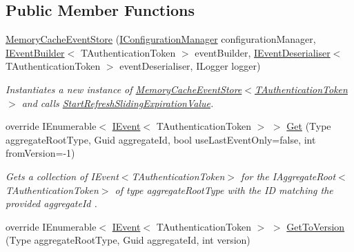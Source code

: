 \subsection*{Public Member Functions}
\begin{DoxyCompactItemize}
\item 
\hyperlink{classCqrs_1_1Events_1_1MemoryCacheEventStore_a4de9139e05d35cb62ba295569a1dc94f_a4de9139e05d35cb62ba295569a1dc94f}{Memory\+Cache\+Event\+Store} (\hyperlink{interfaceCqrs_1_1Configuration_1_1IConfigurationManager}{I\+Configuration\+Manager} configuration\+Manager, \hyperlink{interfaceCqrs_1_1Events_1_1IEventBuilder}{I\+Event\+Builder}$<$ T\+Authentication\+Token $>$ event\+Builder, \hyperlink{interfaceCqrs_1_1Events_1_1IEventDeserialiser}{I\+Event\+Deserialiser}$<$ T\+Authentication\+Token $>$ event\+Deserialiser, I\+Logger logger)
\begin{DoxyCompactList}\small\item\em Instantiates a new instance of \hyperlink{classCqrs_1_1Events_1_1MemoryCacheEventStore_a4de9139e05d35cb62ba295569a1dc94f_a4de9139e05d35cb62ba295569a1dc94f}{Memory\+Cache\+Event\+Store$<$\+T\+Authentication\+Token$>$} and calls \hyperlink{classCqrs_1_1Events_1_1MemoryCacheEventStore_ac2a6da8b2faac7bd5f333bff592fc8f2_ac2a6da8b2faac7bd5f333bff592fc8f2}{Start\+Refresh\+Sliding\+Expiration\+Value}. \end{DoxyCompactList}\item 
override I\+Enumerable$<$ \hyperlink{interfaceCqrs_1_1Events_1_1IEvent}{I\+Event}$<$ T\+Authentication\+Token $>$ $>$ \hyperlink{classCqrs_1_1Events_1_1MemoryCacheEventStore_a1391c260f52f5cf18058cf88ad2d16de_a1391c260f52f5cf18058cf88ad2d16de}{Get} (Type aggregate\+Root\+Type, Guid aggregate\+Id, bool use\+Last\+Event\+Only=false, int from\+Version=-\/1)
\begin{DoxyCompactList}\small\item\em Gets a collection of I\+Event$<$\+T\+Authentication\+Token$>$ for the I\+Aggregate\+Root$<$\+T\+Authentication\+Token$>$ of type {\itshape aggregate\+Root\+Type}  with the ID matching the provided {\itshape aggregate\+Id} . \end{DoxyCompactList}\item 
override I\+Enumerable$<$ \hyperlink{interfaceCqrs_1_1Events_1_1IEvent}{I\+Event}$<$ T\+Authentication\+Token $>$ $>$ \hyperlink{classCqrs_1_1Events_1_1MemoryCacheEventStore_a818fe6785622ebb7b0c6033a0b8ffc89_a818fe6785622ebb7b0c6033a0b8ffc89}{Get\+To\+Version} (Type aggregate\+Root\+Type, Guid aggregate\+Id, int version)

\end{DoxyCompactItemize}
